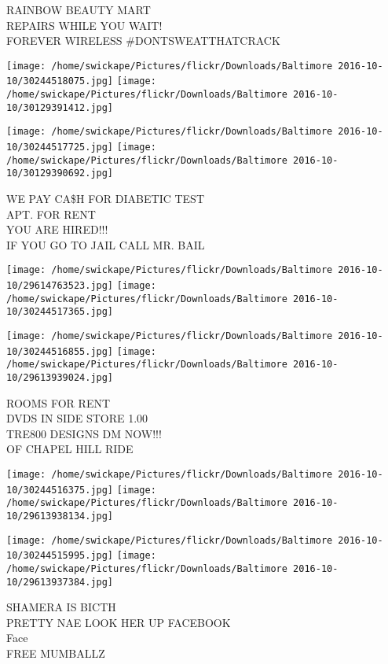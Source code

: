 \documentclass[10pt,letterpaper]{article}
\begin{document}
RAINBOW BEAUTY MART\\
REPAIRS WHILE YOU WAIT!\\
FOREVER WIRELESS \#DONTSWEATTHATCRACK\\
\pagebreak

\texttt{[image: /home/swickape/Pictures/flickr/Downloads/Baltimore 2016-10-10/30244518075.jpg]}
\texttt{[image: /home/swickape/Pictures/flickr/Downloads/Baltimore 2016-10-10/30129391412.jpg]}

\texttt{[image: /home/swickape/Pictures/flickr/Downloads/Baltimore 2016-10-10/30244517725.jpg]}
\texttt{[image: /home/swickape/Pictures/flickr/Downloads/Baltimore 2016-10-10/30129390692.jpg]}

WE PAY CA\$H FOR DIABETIC TEST\\
APT. FOR RENT\\
YOU ARE HIRED!!!\\
IF YOU GO TO JAIL CALL MR. BAIL\\
\pagebreak

\texttt{[image: /home/swickape/Pictures/flickr/Downloads/Baltimore 2016-10-10/29614763523.jpg]}
\texttt{[image: /home/swickape/Pictures/flickr/Downloads/Baltimore 2016-10-10/30244517365.jpg]}

\texttt{[image: /home/swickape/Pictures/flickr/Downloads/Baltimore 2016-10-10/30244516855.jpg]}
\texttt{[image: /home/swickape/Pictures/flickr/Downloads/Baltimore 2016-10-10/29613939024.jpg]}

ROOMS FOR RENT\\
DVDS IN SIDE STORE 1.00\\
TRE800 DESIGNS DM NOW!!!\\
OF CHAPEL HILL RIDE\\
\pagebreak

\texttt{[image: /home/swickape/Pictures/flickr/Downloads/Baltimore 2016-10-10/30244516375.jpg]}
\texttt{[image: /home/swickape/Pictures/flickr/Downloads/Baltimore 2016-10-10/29613938134.jpg]}

\texttt{[image: /home/swickape/Pictures/flickr/Downloads/Baltimore 2016-10-10/30244515995.jpg]}
\texttt{[image: /home/swickape/Pictures/flickr/Downloads/Baltimore 2016-10-10/29613937384.jpg]}

SHAMERA IS BICTH\\
PRETTY NAE LOOK HER UP FACEBOOK\\
Face\\
FREE MUMBALLZ\\
\pagebreak
\end{document}
